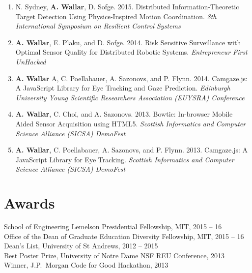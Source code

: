 \documentclass[line,margin]{cv}
\begin{document}
\begin{resume}
\begin{enumerate}

    \item N. Sydney, \textbf{A. Wallar}, D. Sofge. 2015.
        Distributed Information-Theoretic Target Detection Using
        Physics-Inspired Motion Coordination.
        \textit{8th International Symposium on
        Resilient Control Systems}

    \item \textbf{A. Wallar}, E. Plaku, and D. Sofge. 2014. Risk
        Sensitive Surveillance with Optimal Sensor Quality for Distributed
        Robotic Systems. \textit{Entrepreneur First UnHacked}

    \item \textbf{A. Wallar} A, C. Poellabauer, A. Sazonovs, and P. Flynn. 2014.
        Camgaze.js: A JavaScript Library for Eye Tracking and Gaze
        Prediction. \textit{Edinburgh University Young Scientific Researchers
        Association (EUYSRA) Conference}

    \item \textbf{A. Wallar}, C. Choi, and A. Sazonovs. 2013. Bowtie:
        In-browser Mobile Aided Sensor Acquisition using HTML5.
        \textit{Scottish Informatics and Computer Science Alliance
        (SICSA) DemoFest}

    \item \textbf{A. Wallar}, C. Poellabauer, A. Sazonovs, and P. Flynn. 2013.
        Camgaze.js: A JavaScript Library for Eye Tracking. \textit{Scottish
        Informatics and Computer Science Alliance (SICSA) DemoFest}

\end{enumerate}

\section{Awards}

School of Engineering Lemelson Presidential Fellowship, MIT, 2015 -- 16\\
Office of the Dean of Graduate Education Diversity Fellowship, MIT, 2015 -- 16\\
Dean's List, University of St Andrews, 2012 -- 2015\\
Best Poster Prize, University of Notre Dame NSF REU Conference, 2013\\
Winner, J.P.\ Morgan Code for Good Hackathon, 2013


\end{resume}
\end{document}
